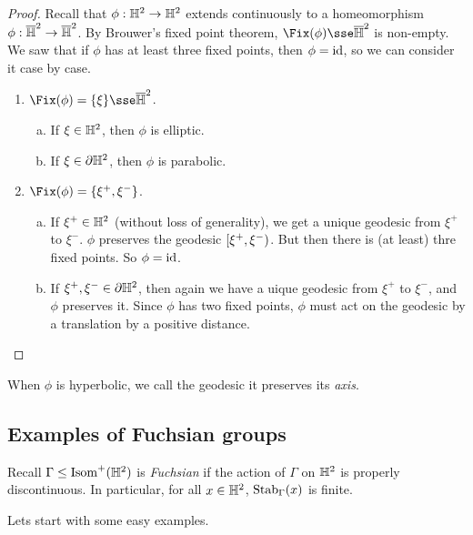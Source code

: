 \documentclass{article}
\begin{document}
\begin{proof}
    Recall that \(\phi : \mathbb{H}^2 \to \mathbb{H}^2\) extends continuously to a homeomorphism \(\phi : \overline{\mathbb{H}}^2 \to \overline{\mathbb{H}}^2\). By Brouwer's fixed point theorem, \(\Fix(\phi) \sse \overline{\bb H}^2\) is non-empty. We saw that if \(\phi\) has at least three fixed points, then \(\phi= \operatorname{id}\), so we can consider it case by case.

    \begin{enumerate}
        \item \(\Fix(\phi) = \{\xi\} \sse \overline{\bb H}^2\).
        \begin{enumerate}[(a)]
            \item If \(\xi \in \mathbb{H}^2\), then \(\phi\) is elliptic.
            \item If \(\xi \in \partial \mathbb{H}^2\), then \(\phi\) is parabolic.
        \end{enumerate} 
        \item \(\Fix(\phi) = \{\xi^+, \xi^-\}\).
        \begin{enumerate}[(a)]
            \item If \(\xi^+ \in \mathbb{H}^2\) (without loss of generality), we get a unique geodesic from \(\xi^+\) to \(\xi^-\). \(\phi\) preserves the geodesic \([\xi^+, \xi^-)\). But then there is (at least) thre fixed points. So \(\phi = \operatorname{id}\).
            \item If \(\xi^+, \xi^- \in \partial\mathbb{H}^2\), then again we have a uique geodesic from \(\xi^+\) to \(\xi^-\), and \(\phi\) preserves it. Since \(\phi\) has two fixed points, \(\phi\) must act on the geodesic by a translation by a positive distance.
        \end{enumerate}
    \end{enumerate}
\end{proof}

When \(\phi\) is hyperbolic, we call the geodesic it preserves its \emph{axis}.

\subsection{Examples of Fuchsian groups}

Recall \(\Gamma \le \operatorname{Isom}^+(\mathbb{H}^2)\) is \emph{Fuchsian} if the action of \(\Gamma\) on \(\mathbb{H}^2\) is properly discontinuous. In particular, for all \(x \in \mathbb{H}^2\), \(\operatorname{Stab}_\Gamma(x)\) is finite.

Lets start with some easy examples.
\end{document}
